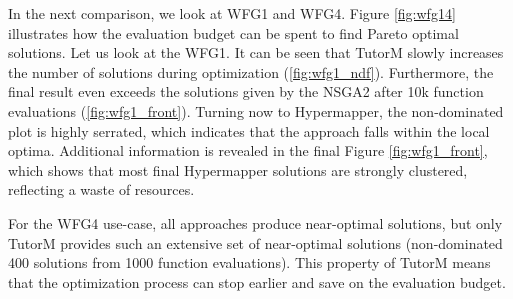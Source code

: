     In the next comparison, we look at WFG1 and WFG4. Figure \ref{fig:wfg14} illustrates how the evaluation budget can be spent to find Pareto optimal solutions. Let us look at the WFG1. It can be seen that TutorM slowly increases the number of solutions during optimization (\ref{fig:wfg1_ndf}). Furthermore, the final result even exceeds the solutions given by the NSGA2 after 10k function evaluations (\ref{fig:wfg1_front}). Turning now to Hypermapper, the non-dominated plot is highly serrated, which indicates that the approach falls within the local optima. Additional information is revealed in the final Figure \ref{fig:wfg1_front}, which shows that most final Hypermapper solutions are strongly clustered, reflecting a waste of resources.

    For the WFG4 use-case, all approaches produce near-optimal solutions, but only TutorM provides such an extensive set of near-optimal solutions (non-dominated 400 solutions from 1000 function evaluations). This property of TutorM means that the optimization process can stop earlier and save on the evaluation budget.

